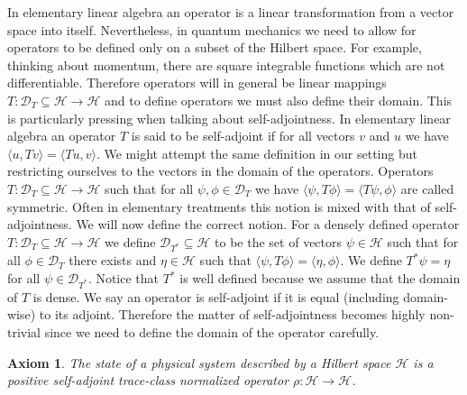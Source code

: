 \documentclass{article}
\newtheorem{axiom}{Axiom}
\begin{document}
In elementary linear algebra an operator is a linear transformation from a vector space into itself. Nevertheless, in quantum mechanics we need to allow for operators to be defined only on a subset of the Hilbert space. For example, thinking about momentum, there are square integrable functions which are not differentiable. Therefore operators will in general be linear mappings $T:\mathcal{D}_T\subseteq\mathcal{H}\rightarrow\mathcal{H}$ and to define operators we must also define their domain. This is particularly pressing when talking about self-adjointness. In elementary linear algebra an operator $T$ is said to be self-adjoint if for all vectors $v$ and $u$ we have $\langle u,Tv\rangle=\langle Tu,v\rangle$. We might attempt the same definition in our setting but restricting ourselves to the vectors in the domain of the operators. Operators $T:\mathcal{D}_T\subseteq\mathcal{H}\rightarrow\mathcal{H}$ such that for all $\psi,\phi\in\mathcal{D}_T$ we have $\langle \psi,T\phi\rangle=\langle T\psi,\phi\rangle$ are called symmetric. Often in elementary treatments this notion is mixed with that of self-adjointness. We will now define the correct notion. For a densely defined operator $T:\mathcal{D}_T\subseteq\mathcal{H}\rightarrow\mathcal{H}$ we define $\mathcal{D}_{T^*}\subseteq\mathcal{H}$ to be the set of vectors $\psi\in\mathcal{H}$ such that for all $\phi\in\mathcal{D}_T$ there exists and $\eta\in\mathcal{H}$ such that $\langle\psi,T\phi\rangle=\langle \eta, \phi\rangle$. We define $T^*\psi=\eta$ for all $\psi\in\mathcal{D}_{T^*}$. Notice that $T^*$ is well defined because we assume that the domain of $T$ is dense. We say an operator is self-adjoint if it is equal (including domain-wise) to its adjoint. Therefore the matter of self-adjointness becomes highly non-trivial since we need to define the domain of the operator carefully.

\begin{axiom}
The state of a physical system described by a Hilbert space $\mathcal{H}$ is a positive self-adjoint trace-class normalized operator $\rho:\mathcal{H}\rightarrow\mathcal{H}$.
\end{axiom}
\end{document}
